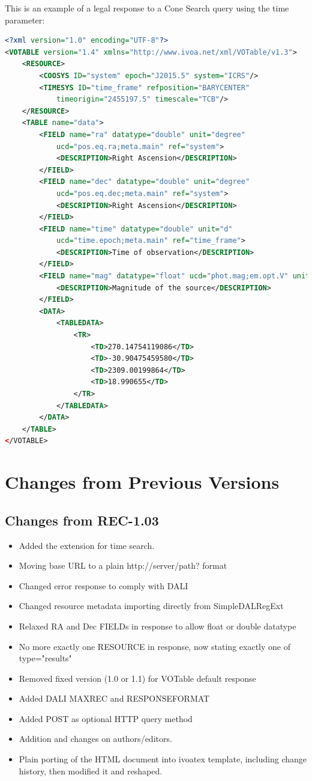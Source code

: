 \documentclass[11pt,a4paper]{ivoa}
\begin{document}
This is an example of a legal response to a Cone Search query using the
time parameter:
\begin{lstlisting}[language=XML,basicstyle=\footnotesize] 
<?xml version="1.0" encoding="UTF-8"?> 
<VOTABLE version="1.4" xmlns="http://www.ivoa.net/xml/VOTable/v1.3">
	<RESOURCE>
		<COOSYS ID="system" epoch="J2015.5" system="ICRS"/> 
		<TIMESYS ID="time_frame" refposition="BARYCENTER" 
			timeorigin="2455197.5" timescale="TCB"/>
	</RESOURCE>
	<TABLE name="data">
		<FIELD name="ra" datatype="double" unit="degree" 
			ucd="pos.eq.ra;meta.main" ref="system"> 
			<DESCRIPTION>Right Ascension</DESCRIPTION>
		</FIELD> 
		<FIELD name="dec" datatype="double" unit="degree" 
			ucd="pos.eq.dec;meta.main" ref="system">
			<DESCRIPTION>Right Ascension</DESCRIPTION>
		</FIELD>
		<FIELD name="time" datatype="double" unit="d" 
			ucd="time.epoch;meta.main" ref="time_frame">
			<DESCRIPTION>Time of observation</DESCRIPTION>
		</FIELD>
		<FIELD name="mag" datatype="float" ucd="phot.mag;em.opt.V" unit="mag"/>
			<DESCRIPTION>Magnitude of the source</DESCRIPTION>
		</FIELD>
		<DATA>
			<TABLEDATA>
				<TR>
					<TD>270.14754119086</TD>
					<TD>-30.90475459580</TD>
					<TD>2309.00199864</TD>
				 	<TD>18.990655</TD>
				</TR>
			</TABLEDATA>
		</DATA> 
	</TABLE>
</VOTABLE>
\end{lstlisting}


\section{Changes from Previous Versions} \label{app:changes}

\subsection{Changes from REC-1.03} 
\begin{itemize}[noitemsep] 
\item Added the extension for time search.  
\item Moving base URL to a plain http://server/path? format 
\item Changed error response to comply with DALI 
\item Changed resource metadata importing directly from SimpleDALRegExt 
\item Relaxed RA and Dec FIELDs in response to allow float or double datatype 
\item No more exactly one RESOURCE in response, now stating exactly one of type="results" 
\item Removed fixed version (1.0 or 1.1) for VOTable default response 
\item Added DALI MAXREC and RESPONSEFORMAT 
\item Added POST as optional HTTP query method 
\item Addition and changes on authors/editors.  
\item Plain porting of the HTML document into ivoatex template, 
including change history, then modified it and reshaped.  
\end{itemize}
\end{document}

